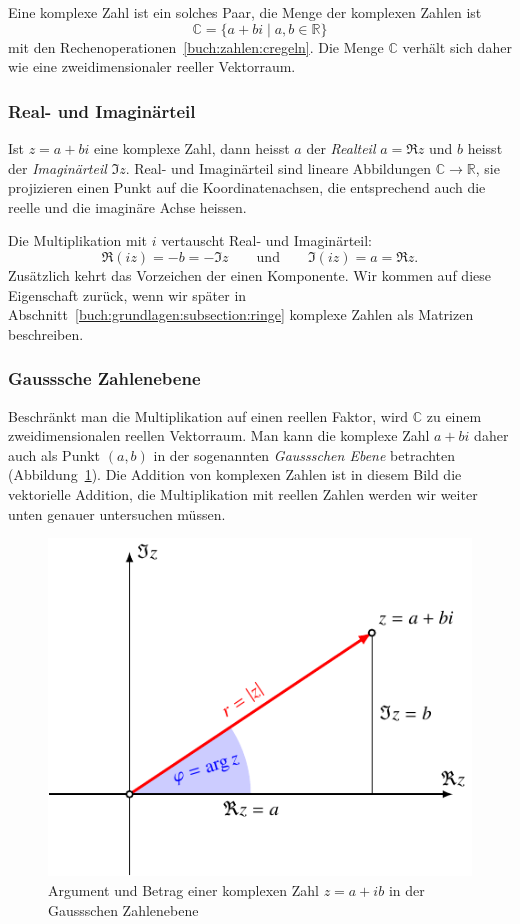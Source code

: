Eine komplexe Zahl ist ein solches Paar, die Menge der komplexen Zahlen
ist
\[
\mathbb{C}
=
\{a+bi\;|\;a,b\in\mathbb{R}\}
\]
mit den Rechenoperationen~\eqref{buch:zahlen:cregeln}.
Die Menge $\mathbb{C}$ verhält sich daher wie eine zweidimensionaler
reeller Vektorraum.

\subsubsection{Real- und Imaginärteil}
Ist $z=a+bi$ eine komplexe Zahl, dann heisst $a$ der {\em Realteil} $a=\Re z$
%
und $b$ heisst der {\em Imaginärteil} $\Im z$.
%
Real- und Imaginärteil sind lineare Abbildungen $\mathbb{C}\to\mathbb{R}$,
sie projizieren einen Punkt auf die Koordinatenachsen, die entsprechend
auch die reelle und die imaginäre Achse heissen.

Die Multiplikation mit $i$ vertauscht Real- und Imaginärteil:
\[
\Re (iz)
=
-b
=
-\Im z
\qquad\text{und}\qquad
\Im (iz)
=
a
=
\Re z.
\]
Zusätzlich kehrt das Vorzeichen der einen Komponente.
Wir kommen auf diese Eigenschaft zurück, wenn wir später in
Abschnitt~\ref{buch:grundlagen:subsection:ringe}
komplexe Zahlen als Matrizen beschreiben.

\subsubsection{Gausssche Zahlenebene}
Beschränkt man die Multiplikation auf einen reellen Faktor, wird $\mathbb{C}$
zu einem zweidimensionalen reellen Vektorraum.
Man kann die komplexe Zahl $a+bi$ daher auch als Punkt $(a,b)$ in der
sogenannten {\em Gaussschen Ebene} betrachten (Abbildung~\ref{buch:zahlen:cfig}).
%
Die Addition von komplexen Zahlen ist in diesem Bild die vektorielle
Addition, die Multiplikation mit reellen Zahlen werden wir weiter unten
genauer untersuchen müssen.

\begin{figure}
\centering
\includegraphics{chapters/05-zahlen/images/komplex.pdf}
\caption{Argument und Betrag einer komplexen Zahl $z=a+ib$ in der 
Gaussschen Zahlenebene
\label{buch:zahlen:cfig}}
\end{figure}%


